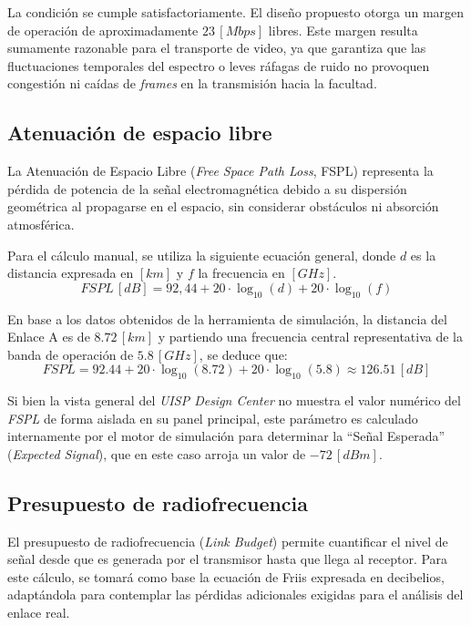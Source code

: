 La condición se cumple satisfactoriamente. El diseño propuesto otorga un margen de operación de aproximadamente $23 \, [Mbps]$ libres. Este margen resulta sumamente razonable para el transporte de video, ya que garantiza que las fluctuaciones temporales del espectro o leves ráfagas de ruido no provoquen congestión ni caídas de \textit{frames} en la transmisión hacia la facultad.



\subsection{Atenuación de espacio libre}
\label{sec_2.10}
La Atenuación de Espacio Libre (\textit{Free Space Path Loss}, FSPL) representa la pérdida de potencia de la señal electromagnética debido a su dispersión geométrica al propagarse en el espacio, sin considerar obstáculos ni absorción atmosférica. \cite{b3}

Para el cálculo manual, se utiliza la siguiente ecuación general, donde $d$ es la distancia expresada en $[km]$ y $f$ la frecuencia en $[GHz]$.
\begin{equation}
    FSPL \, [dB] = 92,44 + 20 \cdot \log_{10}(d) + 20 \cdot \log_{10}(f)
    \label{eq_6}
\end{equation}

En base a los datos obtenidos de la herramienta de simulación, la distancia del Enlace A es de $8.72 \, [km]$ y partiendo una frecuencia central representativa de la banda de operación de $5.8 \, [GHz]$, se deduce que:
\begin{equation}
    FSPL = 92.44 + 20 \cdot \log_{10}(8.72) + 20 \cdot \log_{10}(5.8) \approx 126.51 \, [dB]
    \label{eq_7}
\end{equation}

Si bien la vista general del \textit{UISP Design Center} no muestra el valor numérico del \textit{FSPL} de forma aislada en su panel principal, este parámetro es calculado internamente por el motor de simulación para determinar la ``Señal Esperada'' (\textit{Expected Signal}), que en este caso arroja un valor de $-72 \, [dBm]$.



\subsection{Presupuesto de radiofrecuencia}
\label{sec_2.11}
El presupuesto de radiofrecuencia (\textit{Link Budget}) permite cuantificar el nivel de señal desde que es generada por el transmisor hasta que llega al receptor. Para este cálculo, se tomará como base la ecuación de Friis expresada en decibelios, adaptándola para contemplar las pérdidas adicionales exigidas para el análisis del enlace real.

